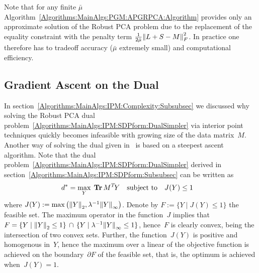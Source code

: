 \documentclass{../../common/projectreport}
\begin{document}
\begin{remark}
Note that for any finite $\bar{\mu}$ Algorithm~\ref{Algorithms:MainAlgs:PGM:APGRPCA:Algorithm} provides only an approximate solution of the Robust PCA problem due to the replacement of the equality constraint with the penalty term $\frac{1}{2\bar{\mu}} {\left\|L+S-M\right\|}_{F}^{2}$. In practice one therefore has to tradeoff accuracy ($\bar{\mu}$ extremely small) and computational efficiency.
\end{remark}


\subsection{Gradient Ascent on the Dual}
\label{Algorithms:MainAlgs:GAD:Subsec}

In section~\ref{Algorithms:MainAlgs:IPM:Complexity:Subsubsec} we discussed why solving the Robust PCA dual problem~\eqref{Algorithms:MainAlgs:IPM:SDPform:DualSimpler} via interior point techniques quickly becomes infeasible with growing size of the data matrix~$M$. Another way of solving the dual given in~\cite{Lin:2009kx} is based on a steepest ascent algorithm. Note that the dual problem~\eqref{Algorithms:MainAlgs:IPM:SDPform:DualSimpler} derived in section~\ref{Algorithms:MainAlgs:IPM:SDPform:Subsubsec} can be written as 
%
\begin{align}
d^* = \max_{Y} \; &\operatorname{\mathbf{Tr}} M^T\!Y \quad \text{subject to}\quad J(Y) \leq 1
\label{Algorithms:MainAlgs:GAD:Dual}
\end{align}
%
where $J(Y) := \max\left({\left\|Y\right\|}_{2}^{}, \lambda^{-1}{\left\|Y\right\|}_{\infty}^{}\right)$. Denote by $F := \{Y \mid J(Y)\leq1 \}$ the feasible set. The maximum operator in the function~$J$ implies that~$F=\{Y \mid {\left\|Y\right\|}_{2}^{}\leq1\}\, \cap\, \{Y \mid \lambda^{-1}{\left\|Y\right\|}_{\infty}^{}\leq1\}$, hence~$F$ is clearly convex, being the intersection of two convex sets. Further, the function~$J(Y)$ is positive and homogenous in~$Y$, hence the maximum over a linear of the objective function is achieved on the boundary~$\partial F$ of the feasible set, that is, the optimum is achieved when~$J(Y)=1$. 
\end{document}
